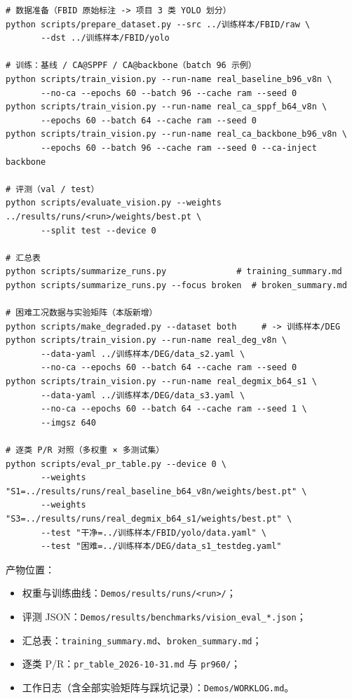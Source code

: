 \documentclass[UTF8,a4paper,11pt]{ctexart}
\begin{document}
\begin{verbatim}
# 数据准备（FBID 原始标注 -> 项目 3 类 YOLO 划分）
python scripts/prepare_dataset.py --src ../训练样本/FBID/raw \
       --dst ../训练样本/FBID/yolo

# 训练：基线 / CA@SPPF / CA@backbone（batch 96 示例）
python scripts/train_vision.py --run-name real_baseline_b96_v8n \
       --no-ca --epochs 60 --batch 96 --cache ram --seed 0
python scripts/train_vision.py --run-name real_ca_sppf_b64_v8n \
       --epochs 60 --batch 64 --cache ram --seed 0
python scripts/train_vision.py --run-name real_ca_backbone_b96_v8n \
       --epochs 60 --batch 96 --cache ram --seed 0 --ca-inject backbone

# 评测（val / test）
python scripts/evaluate_vision.py --weights ../results/runs/<run>/weights/best.pt \
       --split test --device 0

# 汇总表
python scripts/summarize_runs.py              # training_summary.md
python scripts/summarize_runs.py --focus broken  # broken_summary.md

# 困难工况数据与实验矩阵（本版新增）
python scripts/make_degraded.py --dataset both     # -> 训练样本/DEG
python scripts/train_vision.py --run-name real_deg_v8n \
       --data-yaml ../训练样本/DEG/data_s2.yaml \
       --no-ca --epochs 60 --batch 64 --cache ram --seed 0
python scripts/train_vision.py --run-name real_degmix_b64_s1 \
       --data-yaml ../训练样本/DEG/data_s3.yaml \
       --no-ca --epochs 60 --batch 64 --cache ram --seed 1 \
       --imgsz 640

# 逐类 P/R 对照（多权重 × 多测试集）
python scripts/eval_pr_table.py --device 0 \
       --weights "S1=../results/runs/real_baseline_b64_v8n/weights/best.pt" \
       --weights "S3=../results/runs/real_degmix_b64_s1/weights/best.pt" \
       --test "干净=../训练样本/FBID/yolo/data.yaml" \
       --test "困难=../训练样本/DEG/data_s1_testdeg.yaml"
\end{verbatim}

\noindent 产物位置：
\begin{itemize}
  \item 权重与训练曲线：\texttt{Demos/results/runs/<run>/}；
  \item 评测 JSON：\texttt{Demos/results/benchmarks/vision\_eval\_*.json}；
  \item 汇总表：\texttt{training\_summary.md}、\texttt{broken\_summary.md}；
  \item 逐类 P/R：\texttt{pr\_table\_2026-10-31.md} 与 \texttt{pr960/}；
  \item 工作日志（含全部实验矩阵与踩坑记录）：\texttt{Demos/WORKLOG.md}。
\end{itemize}
\end{document}
